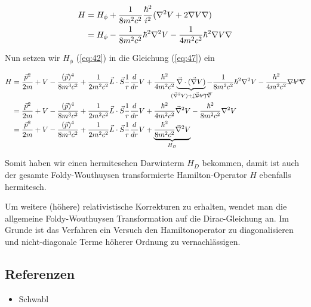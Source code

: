 \begin{align}
  \label{eq:47}
  H &= H_\phi + \frac{1}{8m^2c^2}\frac{\hbar^2}{i^2} (\nabla^2V+2\nabla V \nabla) \notag\\
&= H_\phi - \frac{1}{8m^2c^2}\hbar^2 \nabla^2V  - \frac{1}{4m^2c^2}\hbar^2\nabla V \nabla
\end{align}

Nun setzen wir \(H_\phi\) (\ref{eq:42}) in die Gleichung (\ref{eq:47}) ein

\begin{align}
  \label{eq:48}
  H &=  \frac{\vec p^2}{2m}  +V - \frac{(\vec p)^4 }{8m^3c^2}+ \frac{1 }{2m^2c^2}\vec L\cdot\vec S \frac{1}{r}\frac{d}{dr}V +  \frac{\hbar^2 }{4m^2c^2}\underbr{ \vec \nabla\cdot(\vec\nabla V)}_{(\vec \nabla^2V) + \cancel{(\vec\nabla V)\vec\nabla}} - \frac{1}{8m^2c^2}\hbar^2 \nabla^2V  - \frac{\hbar^2}{4m^2c^2}\cancel{\nabla V \nabla} \notag\\
&=  \frac{\vec p^2}{2m}  +V - \frac{(\vec p)^4 }{8m^3c^2}+ \frac{1 }{2m^2c^2}\vec L\cdot\vec S \frac{1}{r}\frac{d}{dr}V +  \frac{\hbar^2 }{4m^2c^2}\vec \nabla^2V - \frac{\hbar^2}{8m^2c^2} \nabla^2V  \notag\\
&=  \frac{\vec p^2}{2m}  +V - \frac{(\vec p)^4 }{8m^3c^2}+ \frac{1 }{2m^2c^2}\vec L\cdot\vec S \frac{1}{r}\frac{d}{dr}V + \underbr{ \frac{\hbar^2 }{8m^2c^2}\vec \nabla^2V }_{H_D} 
\end{align}

Somit haben wir einen hermiteschen Darwinterm \(H_D\) bekommen, damit ist auch der gesamte  Foldy-Wouthuysen transformierte Hamilton-Operator \(H\) ebenfalls hermitesch.


Um weitere (höhere) relativistische Korrekturen zu erhalten, wendet man die allgemeine  Foldy-Wouthuysen Transformation auf die Dirac-Gleichung an. Im Grunde ist das Verfahren ein Versuch den Hamiltonoperator zu diagonalisieren und nicht-diagonale Terme höherer Ordnung zu vernachlässigen.



 

\subsection*{Referenzen}
\begin{itemize}
\item Schwabl
\end{itemize}


